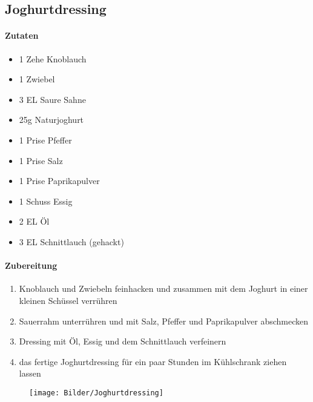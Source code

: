 \newpage
\subsection{Joghurtdressing}
\paragraph{Zutaten}
\begin{itemize}[noitemsep]
	\item 1 Zehe Knoblauch
	\item 1 Zwiebel
	\item 3 EL Saure Sahne
	\item 25g Naturjoghurt
	\item 1 Prise Pfeffer
	\item 1 Prise Salz
	\item 1 Prise Paprikapulver 
	\item 1 Schuss Essig
	\item 2 EL Öl
	\item 3 EL Schnittlauch (gehackt)
\end{itemize}
\paragraph{Zubereitung}
\begin{enumerate}[noitemsep]
	\item Knoblauch und Zwiebeln feinhacken und zusammen mit dem Joghurt in einer kleinen Schüssel verrühren 
	\item Sauerrahm unterrühren und mit Salz, Pfeffer und Paprikapulver abschmecken
	\item Dressing mit Öl, Essig und dem Schnittlauch verfeinern
	\item das fertige Joghurtdressing für ein paar Stunden im Kühlschrank ziehen lassen
\end{enumerate}
\begin{figure}[h]
\centering
\texttt{[image: Bilder/Joghurtdressing]}
\end{figure}